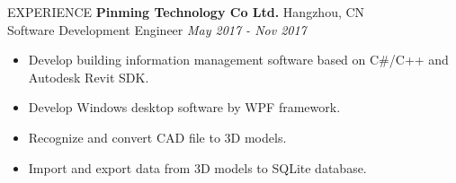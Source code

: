\documentclass{resume} %
\begin{document}
\begin{rSection}{EXPERIENCE}
  \textbf{Pinming Technology Co Ltd.} \hfill Hangzhou, CN\\
  Software Development Engineer \hfill \textit{May 2017 - Nov 2017}
  \begin{itemize}
    \itemsep -3pt {}
    \item Develop building information management software based on C\#/C++ and Autodesk Revit SDK.
    \item Develop Windows desktop software by WPF framework.
    \item Recognize and convert CAD file to 3D models.
    \item Import and export data from 3D models to SQLite database.
  \end{itemize}
  
\end{rSection}
  
\end{document}
